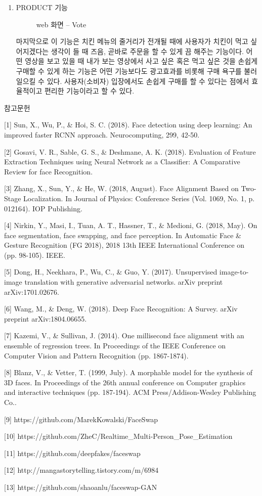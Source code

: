 \documentclass{oblivoir}
\begin{document}
\begin{enumerate}
\begin{enumerate}[가.]
        \item PRODUCT 기능
        
        \begin{figure}[h!]
            \centering
            \caption{web 화면 – Vote}
        \end{figure} 
        
마지막으로 이 기능은 치킨 메뉴의 줄거리가 전개될 때에 사용자가 치킨이 먹고 싶어지겠다는 생각이 들 때 즈음, 곧바로 주문을 할 수 있게 끔 해주는 기능이다. 어떤 영상을 보고 있을 때 내가 보는 영상에서 사고 싶은 혹은 먹고 싶은 것을 손쉽게 구매할 수 있게 하는 기능은 어떤 기능보다도 광고효과를 비롯해 구매 욕구를 불러일으킬 수 있다. 사용자(소비자) 입장에서도 손쉽게 구매를 할 수 있다는 점에서 효율적이고 편리한 기능이라고 할 수 있다.
    \end{enumerate}
\end{enumerate}

참고문헌

[1] Sun, X., Wu, P., \& Hoi, S. C. (2018). Face detection using deep learning: An improved faster RCNN approach. Neurocomputing, 299, 42-50.

[2] Gosavi, V. R., Sable, G. S., \& Deshmane, A. K. (2018). Evaluation of Feature Extraction Techniques using Neural Network as a Classifier: A Comparative Review for face Recognition.

[3] Zhang, X., Sun, Y., \& He, W. (2018, August). Face Alignment Based on Two-Stage Localization. In Journal of Physics: Conference Series (Vol. 1069, No. 1, p. 012164). IOP Publishing.

[4] Nirkin, Y., Masi, I., Tuan, A. T., Hassner, T., \& Medioni, G. (2018, May). On face segmentation, face swapping, and face perception. In Automatic Face \& Gesture Recognition (FG 2018), 2018 13th IEEE International Conference on (pp. 98-105). IEEE.

[5] Dong, H., Neekhara, P., Wu, C., \& Guo, Y. (2017). Unsupervised image-to-image translation with generative adversarial networks. arXiv preprint arXiv:1701.02676.

[6] Wang, M., \& Deng, W. (2018). Deep Face Recognition: A Survey. arXiv preprint arXiv:1804.06655.

[7] Kazemi, V., \& Sullivan, J. (2014). One millisecond face alignment with an ensemble of regression trees. In Proceedings of the IEEE Conference on Computer Vision and Pattern Recognition (pp. 1867-1874).

[8] Blanz, V., \& Vetter, T. (1999, July). A morphable model for the synthesis of 3D faces. In Proceedings of the 26th annual conference on Computer graphics and interactive techniques (pp. 187-194). ACM Press/Addison-Wesley Publishing Co..

[9] https://github.com/MarekKowalski/FaceSwap

[10] https://github.com/ZheC/Realtime_Multi-Person_Pose_Estimation

[11] https://github.com/deepfakes/faceswap

[12] http://mangastorytelling.tistory.com/m/6984

[13] https://github.com/shaoanlu/faceswap-GAN
\end{document}

